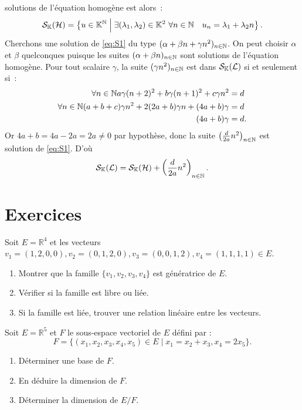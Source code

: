 \begin{itemize}
\begin{itemize}
        solutions de l'équation homogène est alors~:
        \begin{equation}
          \mathcal{S}_{\mathbb{K}}(\mathcal{H}) = \left\{u \in \mathbb{K}^{\mathbb{N}}\mathrel{}\middle|\mathrel{}\exists (\lambda_1, \lambda_2) \in 
          \mathbb{K}^2 \ \forall n \in \mathbb{N} \quad u_n = \lambda_1+\lambda_2 n\right\}.
        \end{equation}
        Cherchons une solution de \eqref{eq:S1} du type \((\alpha+\beta n + 
        \gamma n^2)_{n \in \mathbb{N}}\). On peut choisir \(\alpha\) et \(\beta\) 
        quelconques puisque les suites \((\alpha+\beta n)_{n \in \mathbb{N}}\) sont 
        solutions de l'équation homogène. Pour tout scalaire \(\gamma\), la 
        suite \((\gamma n^2)_{n \in \mathbb{N}}\) est dans \(\mathcal{S}_{\mathbb{K}}(\mathcal{L})\) si et 
        seulement si~:
        \begin{align}
          \forall n \in \mathbb{N} a\gamma(n+2)^2 +b\gamma(n+1)^2 +c\gamma n^2 &=d\\
          \forall n \in \mathbb{N} (a+b+c)\gamma n^2 +2(2a+b)\gamma n +(4a+b)\gamma 
          &=d \\
          (4a+b)\gamma &=d.
        \end{align}
        Or \(4a+b=4a-2a=2a \neq 0\) par hypothèse, donc la suite 
        \(\left(\frac{d}{2a} n^2\right)_{n \in \mathbb{N}}\) est solution de 
        \eqref{eq:S1}. D'où
        \begin{equation}
          \mathcal{S}_{\mathbb{K}}(\mathcal{L}) = \mathcal{S}_{\mathbb{K}}(\mathcal{H}) + \left(\frac{d}{2a} n^2\right)_{n \in \mathbb{N}}.
        \end{equation}
    \end{itemize}
\end{itemize}
\section{Exercices}
\begin{exercice}
Soit \( E = \mathbb{R}^4 \) et les vecteurs \( v_1 = (1, 2, 0, 0), v_2 = (0, 1, 2, 0), v_3 = (0, 0, 1, 2), v_4 = (1, 1, 1, 1) \in E \).
\begin{enumerate}
    \item Montrer que la famille \( \{v_1, v_2, v_3, v_4\} \) est génératrice de \( E \).
    \item Vérifier si la famille est libre ou liée.
    \item Si la famille est liée, trouver une relation linéaire entre les vecteurs.
\end{enumerate}
\end{exercice}

\begin{exercice}
Soit \( E = \mathbb{R}^5 \) et \( F \) le sous-espace vectoriel de \( E \) défini par :
\[
F = \{(x_1, x_2, x_3, x_4, x_5) \in E \mid x_1 = x_2 + x_3, x_4 = 2x_5\}.
\]
\begin{enumerate}
    \item Déterminer une base de \( F \).
    \item En déduire la dimension de \( F \).
    \item Déterminer la dimension de \( E / F \).
\end{enumerate}
\end{exercice}

